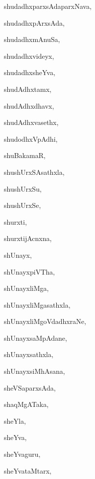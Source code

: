 \begin{multicols}{3}
{\noindent
{shudadhxparxsAdaparxNava}, \pageref{shudadhxparxsAdaparxNava}

\noindent
{shudadhxpArxsAda}, \pageref{shudadhxpArxsAda}

\noindent
{shudadhxmAnuSa}, \pageref{shudadhxmAnuSa}

\noindent
{shudadhxvideyx}, \pageref{shudadhxvideyx}

\noindent
{shudadhxsheYva}, \pageref{shudadhxsheYva}

\noindent
{shudAdhxtamx}, \pageref{shudAdhxtamx}

\noindent
{shudAdhxdhavx}, \pageref{shudAdhxdhavx}

\noindent
{shudAdhxvasethx}, \pageref{shudAdhxvasethx}

\noindent
{shudodhxVpAdhi}, \pageref{shudodhxVpAdhi}

\noindent
{shuBakamaR}, \pageref{shuBakamaR}

\noindent
{shushUrxSAsathxla}, \pageref{shushUrxSAsathxla}

\noindent
{shushUrxSu}, \pageref{shushUrxSu}

\noindent
{shushUrxSe}, \pageref{shushUrxSe}

\noindent
{shurxti}, \pageref{shurxti}

\noindent
{shurxtijAcnxna}, \pageref{shurxtijAcnxna}

\noindent
{shUnayx}, \pageref{shUnayx}

\noindent
{shUnayxpiVTha}, \pageref{shUnayxpiVTha}

\noindent
{shUnayxliMga}, \pageref{shUnayxliMga}

\noindent
{shUnayxliMgasathxla}, \pageref{shUnayxliMgasathxla}

\noindent
{shUnayxliMgoVdadhxraNe}, \pageref{shUnayxliMgoVdadhxraNe}

\noindent
{shUnayxsaMpAdane}, \pageref{shUnayxsaMpAdane}

\noindent
{shUnayxsathxla}, \pageref{shUnayxsathxla}

\noindent
{shUnayxsiMhAsana}, \pageref{shUnayxsiMhAsana}

\noindent
{sheVSaparxsAda}, \pageref{sheVSaparxsAda}

\noindent
{shaqMgATaka}, \pageref{shaqMgATaka}

\noindent
{sheYla}, \pageref{sheYla}

\noindent
{sheYva}, \pageref{sheYva}

\noindent
{sheYvaguru}, \pageref{sheYvaguru}

\noindent
{sheYvataMtarx}, \pageref{sheYvataMtarx}

}
\end{multicols}
